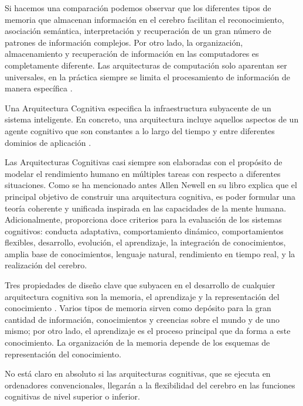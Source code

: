 Si hacemos una comparaci\'{o}n podemos observar que los diferentes tipos de memoria que almacenan informaci\'{o}n en el cerebro facilitan el reconocimiento, asociaci\'{o}n sem\'{a}ntica, interpretaci\'{o}n y recuperaci\'{o}n de un gran n\'{u}mero de patrones de informaci\'{o}n complejos. Por otro lado, la organizaci\'{o}n, almacenamiento y recuperaci\'{o}n de informaci\'{o}n en las computadores es completamente diferente. Las arquitecturas de computaci\'{o}n solo aparentan ser universales, en la pr\'{a}ctica siempre se limita el procesamiento de informaci\'{o}n de manera espec\'{i}fica \cite{duch2008cognitive}. 

Una Arquitectura Cognitiva especifica la infraestructura subyacente de un sistema inteligente. En concreto, una arquitectura incluye aquellos aspectos de un agente cognitivo que son constantes a lo largo del tiempo y entre
diferentes dominios de aplicación \cite{langley2009cognitive}.

Las Arquitecturas Cognitivas casi siempre son elaboradas con el prop\'{o}sito de  modelar el rendimiento humano en múltiples tareas con respecto a diferentes situaciones. Como se ha mencionado antes Allen Newell en su libro \cite{newell1994unified} explica que el principal objetivo de construir una arquitectura cognitiva, es poder formular una teor\'{i}a coherente y unificada inspirada en las capacidades de la mente humana. Adicionalmente, proporciona doce criterios para la evaluación de los sistemas cognitivos: conducta adaptativa, comportamiento dinámico, comportamientos flexibles, desarrollo, evolución, el aprendizaje, la integración de conocimientos, amplia base de conocimientos, lenguaje natural, rendimiento en tiempo real, y la realización del cerebro.

Tres propiedades de diseño clave que subyacen en el desarrollo de cualquier arquitectura cognitiva son la memoria,
el aprendizaje y la representaci\'{o}n del conocimiento \cite{langley2009cognitive,duch2008cognitive}. Varios tipos de memoria sirven como depósito para la gran cantidad de informaci\'{o}n, conocimientos y creencias sobre el mundo y de uno mismo; por otro lado, el aprendizaje es el proceso principal que da forma a este conocimiento. La organizaci\'{o}n de la memoria depende de los esquemas de representación del conocimiento. 
 
 No está claro en absoluto si las arquitecturas cognitivas, que se ejecuta en ordenadores convencionales, llegar\'{a}n a la flexibilidad del cerebro en las funciones cognitivas de nivel superior o inferior.

